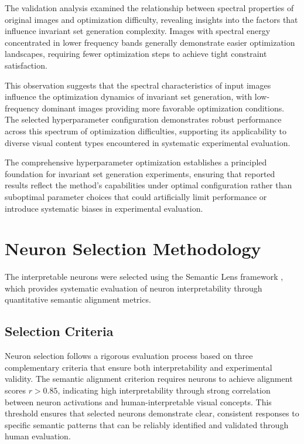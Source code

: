The validation analysis examined the relationship between spectral properties of original images and optimization difficulty, revealing insights into the factors that influence invariant set generation complexity. Images with spectral energy concentrated in lower frequency bands generally demonstrate easier optimization landscapes, requiring fewer optimization steps to achieve tight constraint satisfaction.

This observation suggests that the spectral characteristics of input images influence the optimization dynamics of invariant set generation, with low-frequency dominant images providing more favorable optimization conditions. The selected hyperparameter configuration demonstrates robust performance across this spectrum of optimization difficulties, supporting its applicability to diverse visual content types encountered in systematic experimental evaluation.

The comprehensive hyperparameter optimization establishes a principled foundation for invariant set generation experiments, ensuring that reported results reflect the method's capabilities under optimal configuration rather than suboptimal parameter choices that could artificially limit performance or introduce systematic biases in experimental evaluation.

\section{Neuron Selection Methodology}\label{appendix:neuron_selection}

The interpretable neurons were selected using the Semantic Lens framework \citep{dreyer2025mechanisticunderstandingvalidationlarge}, which provides systematic evaluation of neuron interpretability through quantitative semantic alignment metrics.

\subsection{Selection Criteria}

Neuron selection follows a rigorous evaluation process based on three complementary criteria that ensure both interpretability and experimental validity. The semantic alignment criterion requires neurons to achieve alignment scores $r > 0.85$, indicating high interpretability through strong correlation between neuron activations and human-interpretable visual concepts. This threshold ensures that selected neurons demonstrate clear, consistent responses to specific semantic patterns that can be reliably identified and validated through human evaluation.

